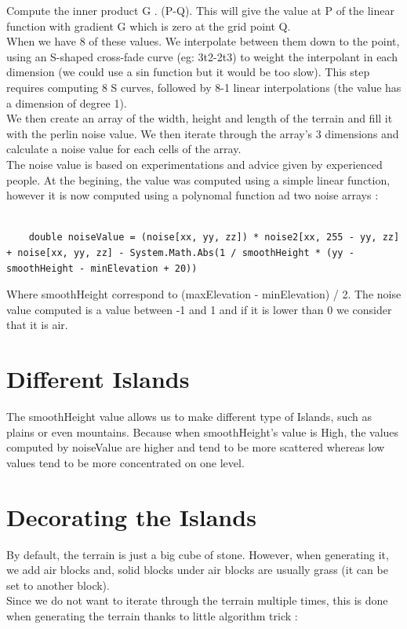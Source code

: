 \documentclass[article]{report}         %
\begin{document}
            Compute the inner product G . (P-Q). This will give the value at P of the linear function with gradient G which is zero at the grid point Q.\\

            When we have 8 of these values. We interpolate between them down to the point, using an S-shaped cross-fade curve (eg: 3t2-2t3) to weight the interpolant in each dimension (we could use a sin function but it would be too slow). This step requires computing 8 S curves, followed by 8-1 linear interpolations (the value has a dimension of degree 1).\\

            We then create an array of the width, height and length of the terrain and fill it with the perlin noise value. We then iterate through the array's 3 dimensions and calculate a noise value for each cells of the array.\\
            The noise value is based on experimentations and advice given by experienced people. At the begining, the value was computed using a simple linear function, however it is now computed using a polynomal function ad two noise arrays :

            \begin{lstlisting}
              
	double noiseValue = (noise[xx, yy, zz]) * noise2[xx, 255 - yy, zz] + noise[xx, yy, zz] - System.Math.Abs(1 / smoothHeight * (yy - smoothHeight - minElevation + 20))

            \end{lstlisting}

            Where smoothHeight correspond to (maxElevation - minElevation) / 2. The noise value computed is a value between -1 and 1 and if it is lower than 0 we consider that it is air.
      \section{Different Islands}
				The smoothHeight value allows us to make different type of Islands, such as plains or even mountains. Because when smoothHeight's value is High, the values computed by noiseValue are higher and tend to be more scattered whereas low values tend to be more concentrated on one level.
      \section{Decorating the Islands}
        By default, the terrain is just a big cube of stone. However, when generating it, we add air blocks and, solid blocks under air blocks are usually grass (it can be set to another block).\\
        Since we do not want to iterate through the terrain multiple times, this is done when generating the terrain thanks to little algorithm trick :\\
\end{document}
